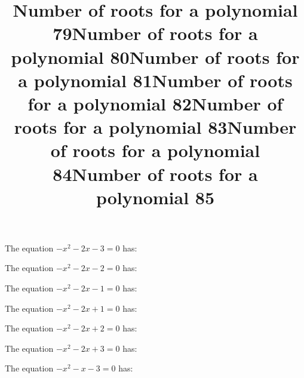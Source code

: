 \documentclass{article}
\begin{document}
\begin{category}
\begin{question}[multichoice]
\end{question}
\begin{question}[multichoice]
\title{Number of roots for a polynomial 79}
The equation $- x^{2} - 2 x - 3=0$ has:



\end{question}
\begin{question}[multichoice]
\title{Number of roots for a polynomial 80}
The equation $- x^{2} - 2 x - 2=0$ has:



\end{question}
\begin{question}[multichoice]
\title{Number of roots for a polynomial 81}
The equation $- x^{2} - 2 x - 1=0$ has:



\end{question}
\begin{question}[multichoice]
\title{Number of roots for a polynomial 82}
The equation $- x^{2} - 2 x + 1=0$ has:



\end{question}
\begin{question}[multichoice]
\title{Number of roots for a polynomial 83}
The equation $- x^{2} - 2 x + 2=0$ has:



\end{question}
\begin{question}[multichoice]
\title{Number of roots for a polynomial 84}
The equation $- x^{2} - 2 x + 3=0$ has:



\end{question}
\begin{question}[multichoice]
\title{Number of roots for a polynomial 85}
The equation $- x^{2} - x - 3=0$ has:


\end{question}
\end{category}
\end{document}
